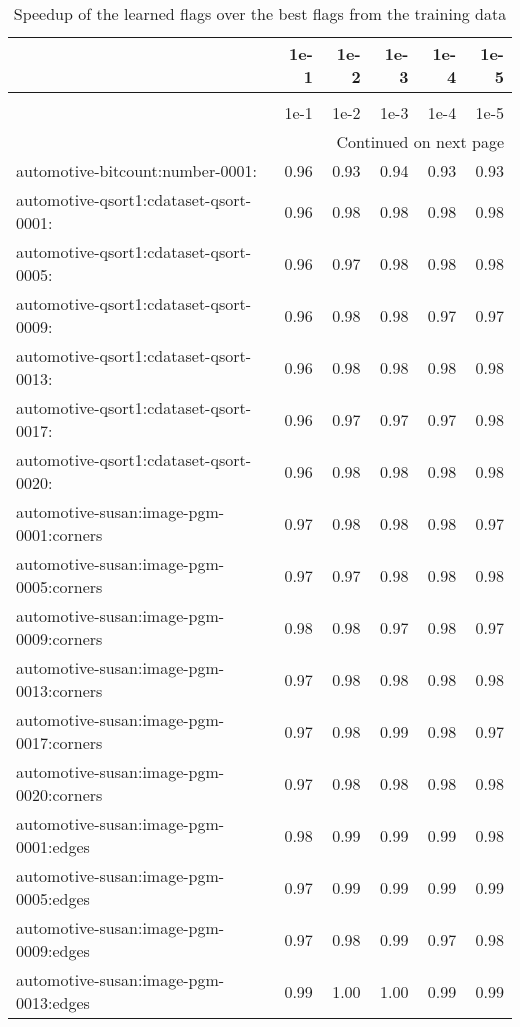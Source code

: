 \begin{longtable}{lrrrrr}
\caption{Speedup of the learned flags over the best flags from the training data} \label{table:validate-score-speedup} \\
\toprule
 & 1e-1 & 1e-2 & 1e-3 & 1e-4 & 1e-5 \\
\midrule
\endfirsthead
\caption[]{Speedup of the learned flags over the best flags from the training data} \\
\toprule
 & 1e-1 & 1e-2 & 1e-3 & 1e-4 & 1e-5 \\
\midrule
\endhead
\midrule
\multicolumn{6}{r}{Continued on next page} \\
\midrule
\endfoot
\bottomrule
\endlastfoot
automotive-bitcount:number-0001: & 0.96 & 0.93 & 0.94 & 0.93 & 0.93 \\
automotive-qsort1:cdataset-qsort-0001: & 0.96 & 0.98 & 0.98 & 0.98 & 0.98 \\
automotive-qsort1:cdataset-qsort-0005: & 0.96 & 0.97 & 0.98 & 0.98 & 0.98 \\
automotive-qsort1:cdataset-qsort-0009: & 0.96 & 0.98 & 0.98 & 0.97 & 0.97 \\
automotive-qsort1:cdataset-qsort-0013: & 0.96 & 0.98 & 0.98 & 0.98 & 0.98 \\
automotive-qsort1:cdataset-qsort-0017: & 0.96 & 0.97 & 0.97 & 0.97 & 0.98 \\
automotive-qsort1:cdataset-qsort-0020: & 0.96 & 0.98 & 0.98 & 0.98 & 0.98 \\
automotive-susan:image-pgm-0001:corners & 0.97 & 0.98 & 0.98 & 0.98 & 0.97 \\
automotive-susan:image-pgm-0005:corners & 0.97 & 0.97 & 0.98 & 0.98 & 0.98 \\
automotive-susan:image-pgm-0009:corners & 0.98 & 0.98 & 0.97 & 0.98 & 0.97 \\
automotive-susan:image-pgm-0013:corners & 0.97 & 0.98 & 0.98 & 0.98 & 0.98 \\
automotive-susan:image-pgm-0017:corners & 0.97 & 0.98 & 0.99 & 0.98 & 0.97 \\
automotive-susan:image-pgm-0020:corners & 0.97 & 0.98 & 0.98 & 0.98 & 0.98 \\
automotive-susan:image-pgm-0001:edges & 0.98 & 0.99 & 0.99 & 0.99 & 0.98 \\
automotive-susan:image-pgm-0005:edges & 0.97 & 0.99 & 0.99 & 0.99 & 0.99 \\
automotive-susan:image-pgm-0009:edges & 0.97 & 0.98 & 0.99 & 0.97 & 0.98 \\
automotive-susan:image-pgm-0013:edges & 0.99 & 1.00 & 1.00 & 0.99 & 0.99 \\

\end{longtable}
